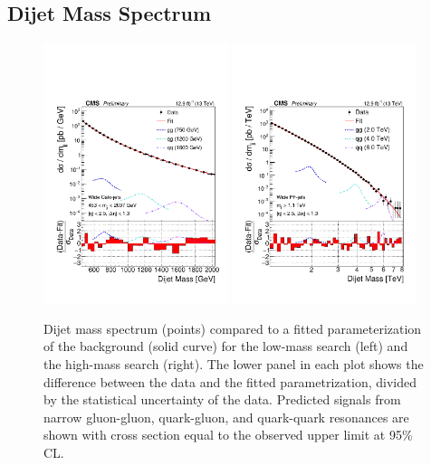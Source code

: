 \subsection{Dijet Mass Spectrum}

\begin{figure}[hbtp]
  \begin{center}
    \includegraphics[width=0.48\textwidth]{figs/dijet/fit_mjj_Full_CaloDijet2016.pdf}
    \includegraphics[width=0.48\textwidth]{figs/dijet/fit_mjj_Full_PFDijet2016.pdf}
   \caption{
    Dijet mass spectrum (points) compared to a fitted
  parameterization of the background (solid curve) for the low-mass search (left) and 
  the high-mass search (right).
  The lower panel in each plot shows the difference between the data and the
  fitted parametrization, divided by the statistical uncertainty of the data. Predicted 
  signals from narrow gluon-gluon, quark-gluon, and quark-quark resonances are shown with cross section 
  equal to the observed upper limit at 95\% CL.}
    \label{figDataAndFit}
  \end{center}
\end{figure}


